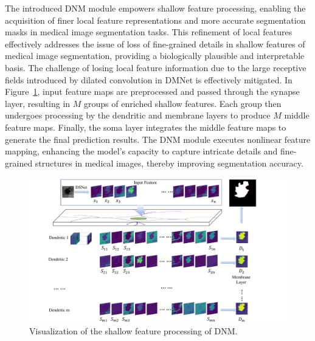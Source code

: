 \documentclass[review]{elsarticle}
\begin{document}
	The introduced DNM module empowers shallow feature processing, enabling the acquisition of finer local feature representations and more accurate segmentation masks in medical image segmentation tasks. This refinement of local features effectively addresses the issue of loss of fine-grained details in shallow features of medical image segmentation, providing a biologically plausible and interpretable basis. The challenge of losing local feature information due to the large receptive fields introduced by dilated convolution in DMNet is effectively mitigated. In Figure~\ref{fig:feature}, input feature maps are preprocessed and passed through the synapse layer, resulting in $ M $ groups of enriched shallow features. Each group then undergoes processing by the dendritic and membrane layers to produce $ M $ middle feature maps. Finally, the soma layer integrates the middle feature maps to generate the final prediction results. The DNM module executes nonlinear feature mapping, enhancing the model's capacity to capture intricate details and fine-grained structures in medical images, thereby improving segmentation accuracy.

	\begin{figure}[t]
		\centering
		\begin{adjustwidth}{-2.9cm}{}
			\includegraphics[scale=0.6]{feature.pdf}
		\end{adjustwidth}
		\caption{Visualization of the shallow feature processing of DNM.}
		\label{fig:feature}
	\end{figure}
	
\end{document}

